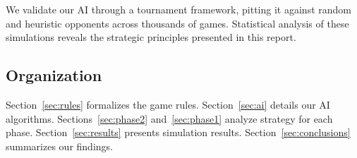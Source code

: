 We validate our AI through a tournament framework, pitting it against random
and heuristic opponents across thousands of games. Statistical analysis of
these simulations reveals the strategic principles presented in this report.

\subsection{Organization}

Section~\ref{sec:rules} formalizes the game rules.
Section~\ref{sec:ai} details our AI algorithms.
Sections~\ref{sec:phase2} and~\ref{sec:phase1} analyze strategy for each phase.
Section~\ref{sec:results} presents simulation results.
Section~\ref{sec:conclusions} summarizes our findings.
